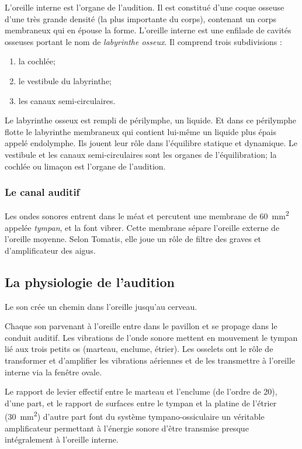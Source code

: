 L'oreille interne est l'organe de l'audition. Il
est constitué d'une coque osseuse d'une très grande densité (la plus
importante du corps), contenant un corps membraneux qui en épouse
la forme. 
L'oreille interne est une enfilade de cavités osseuses portant 
le nom de \emph{labyrinthe osseux}. Il comprend trois subdivisions : 
\begin{enumerate}
	\item la cochlée;
	\item le vestibule du labyrinthe;
	\item  les canaux semi-circulaires.
\end{enumerate}

Le labyrinthe
osseux est rempli de périlymphe, un liquide. Et dans ce périlymphe
flotte le labyrinthe membraneux qui contient lui-même un liquide
plus épais appelé endolymphe. Ils jouent leur rôle dans l'équilibre
statique et dynamique. Le vestibule et les canaux semi-circulaires
sont les organes de l'équilibration; la cochlée ou
limaçon est l'organe de l'audition. 

\subsubsection{Le canal auditif}
Les ondes sonores entrent dans le méat et percutent
une membrane de \SI{60}{\milli\metre\squared} appelée \emph{tympan}, et la font vibrer. Cette membrane
sépare l'oreille externe de l'oreille moyenne. Selon Tomatis, elle
joue un rôle de filtre des graves et d'amplificateur des aigus.



\subsection{La physiologie de l'audition}

Le  son crée un chemin dans 
l'oreille\autocite[chap. 8, pp. 322--324]{marieb:biologie} jusqu'au cerveau.

Chaque son parvenant à l'oreille entre dans le pavillon et se propage
dans le conduit auditif. Les vibrations de l'onde sonore mettent en
mouvement le tympan lié aux trois petits os (marteau, enclume, étrier).
Les osselets ont le rôle de transformer et d'amplifier les vibrations
aériennes et de les transmettre à l'oreille interne via la fenêtre
ovale.

Le rapport de levier effectif entre le marteau et l'enclume
(de l'ordre de 20), d'une part, et le
rapport de surfaces entre le tympan et la platine de l'étrier
(\SI{30}{\milli\metre\squared}) d\textquoteright autre part font du système tympano-ossiculaire
un véritable amplificateur permettant à l\textquoteright énergie sonore
d\textquoteright être transmise presque intégralement à l\textquoteright oreille
interne.

